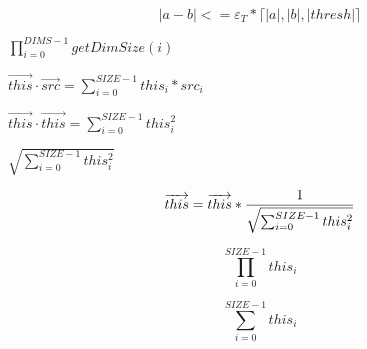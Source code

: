 \documentclass{article}
\begin{document}
\[ |a-b| <= \varepsilon_T * \lceil |a|,|b|,|thresh| \rceil \]
\pagebreak

$ \prod_{i=0}^{DIMS-1} getDimSize(i) $
\pagebreak

$ \overrightarrow{this} \cdot \overrightarrow{src}  = \sum_{i=0}^{SIZE-1} {this_i * src_i} $
\pagebreak

$ \overrightarrow{this} \cdot \overrightarrow{this} = \sum_{i=0}^{SIZE-1} this_i^2 $
\pagebreak

$ \sqrt{\sum_{i=0}^{SIZE-1} this_i^2} $
\pagebreak

\[ \overrightarrow{this} = \overrightarrow{this} * {1 \over {\sqrt{\sum_{i=0}^{SIZE-1} this_i^2}}}  \]
\pagebreak

\[ \prod_{i=0}^{SIZE-1} this_i \]
\pagebreak

\[ \sum_{i=0}^{SIZE-1} this_i \]
\pagebreak
\end{document}
